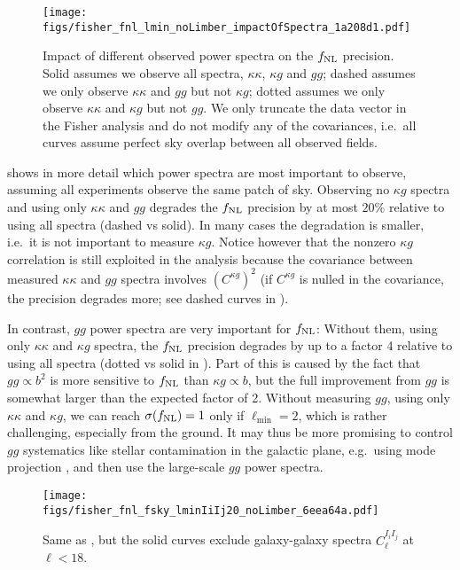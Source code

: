 \documentclass[prd,superscriptaddress,floatfix,notitlepage,nofootinbib,reprint]{revtex4-1} %
\begin{document}
\begin{figure}[tbp]
\texttt{[image: figs/fisher\_fnl\_lmin\_noLimber\_impactOfSpectra\_1a208d1.pdf]}
\caption{Impact of different observed power spectra on the ${f_\mathrm{NL}}$ precision. 
Solid assumes we observe all spectra, $\kappa\kappa$, $\kappa g$ and $gg$;
dashed assumes we only observe $\kappa\kappa$ and $gg$ but not $\kappa g$;
dotted assumes we only observe $\kappa\kappa$ and $\kappa g$ but not $gg$.
We only truncate the data vector in the Fisher analysis and do not modify any of the covariances, i.e.~all curves assume perfect sky overlap between all observed fields.
}
\label{fig:fnl_lmin_spectraImpact}
\end{figure}


 shows in more detail which power spectra are most important to observe, assuming all experiments observe the same patch of sky.
Observing no $\kappa g$ spectra and using only $\kappa\kappa$ and $gg$ degrades the ${f_\mathrm{NL}}$ precision by at most $20\%$ relative to using all spectra (dashed vs solid). In many cases the degradation is smaller, i.e.~it is not important to measure $\kappa g$.
Notice however that the nonzero $\kappa g$ correlation is still exploited in the analysis because the covariance between measured $\kappa\kappa$ and $gg$ spectra involves $(C^{\kappa g})^2$ (if $C^{\kappa g}$ is nulled in the covariance, the precision degrades more; see dashed curves in ).

In contrast, $gg$ power spectra are very important for ${f_\mathrm{NL}}$:
Without them, using only $\kappa\kappa$ and $\kappa g$ spectra, the ${f_\mathrm{NL}}$ precision degrades by up to a factor 4 relative to using all spectra (dotted vs solid in ).
Part of this is caused by the fact that $gg\propto b^2$ is more sensitive to ${f_\mathrm{NL}}$ than $\kappa g\propto b$, but the full improvement from $gg$ is somewhat larger than the expected factor of 2. 
Without measuring $gg$, using only $\kappa\kappa$ and $\kappa g$, we can reach $\sigma({f_\mathrm{NL}})=1$ only if $\ell_\mathrm{min}=2$, which is rather challenging, especially from the ground.
It may thus be more promising to control $gg$ systematics like stellar contamination in the galactic plane, e.g.~using mode projection \cite{1992ApJ...398..169R,Slosar:2004fr,Leistedt1404,Leistedt1405}, and then use the large-scale $gg$ power spectra.


\begin{figure}[tbp]
\texttt{[image: figs/fisher\_fnl\_fsky\_lminIiIj20\_noLimber\_6eea64a.pdf]}
\caption{Same as , but the solid curves exclude galaxy-galaxy spectra $C^{I_iI_j}_\ell$ at $\ell<18$.
}
\label{fig:fnl_fsky_lminIjIj20}
\end{figure}
\end{document}
